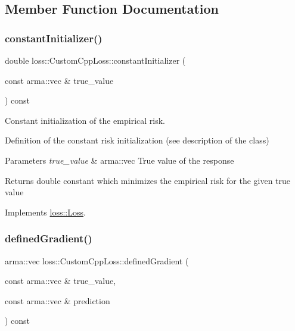 \subsection{Member Function Documentation}
\mbox{\label{classloss_1_1_custom_cpp_loss_a7e3691161855a4a3152982274e74c96a}} 
\subsubsection{\texorpdfstring{constant\+Initializer()}{constantInitializer()}}
{\footnotesize\ttfamily double loss\+::\+Custom\+Cpp\+Loss\+::constant\+Initializer (\begin{DoxyParamCaption}\item[{const arma\+::vec \&}]{true\+\_\+value }\end{DoxyParamCaption}) const\hspace{0.3cm}{\ttfamily [virtual]}}



Constant initialization of the empirical risk. 

Definition of the constant risk initialization (see description of the class)


\begin{DoxyParams}{Parameters}
{\em true\+\_\+value} & {\ttfamily arma\+::vec} True value of the response\\
\hline
\end{DoxyParams}
\begin{DoxyReturn}{Returns}
{\ttfamily double} constant which minimizes the empirical risk for the given true value 
\end{DoxyReturn}


Implements \hyperlink{classloss_1_1_loss_a65fe7dcd9370e6a549b8d1cc95fc8798}{loss\+::\+Loss}.

\mbox{\label{classloss_1_1_custom_cpp_loss_a3ff741b3a4d4c3f3515660dcb7b32781}} 
\subsubsection{\texorpdfstring{defined\+Gradient()}{definedGradient()}}
{\footnotesize\ttfamily arma\+::vec loss\+::\+Custom\+Cpp\+Loss\+::defined\+Gradient (\begin{DoxyParamCaption}\item[{const arma\+::vec \&}]{true\+\_\+value,  }\item[{const arma\+::vec \&}]{prediction }\end{DoxyParamCaption}) const\hspace{0.3cm}{\ttfamily [virtual]}}



